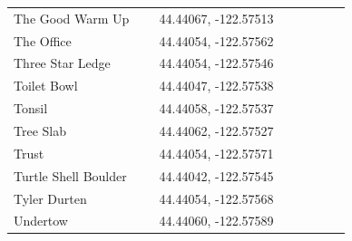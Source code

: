 \begin{flushleft}
\begin{center}
\begin{supertabular}{p{0.38\linewidth}p{0.5\linewidth}}
The Good Warm Up & 44.44067, -122.57513 \\
The Office & 44.44054, -122.57562 \\
Three Star Ledge & 44.44054, -122.57546 \\
Toilet Bowl & 44.44047, -122.57538 \\
Tonsil & 44.44058, -122.57537 \\
Tree Slab & 44.44062, -122.57527 \\
Trust & 44.44054, -122.57571 \\
Turtle Shell Boulder & 44.44042, -122.57545 \\
Tyler Durten & 44.44054, -122.57568 \\
Undertow & 44.44060, -122.57589 \\
\end{supertabular}
\end{center}

\end{flushleft}
